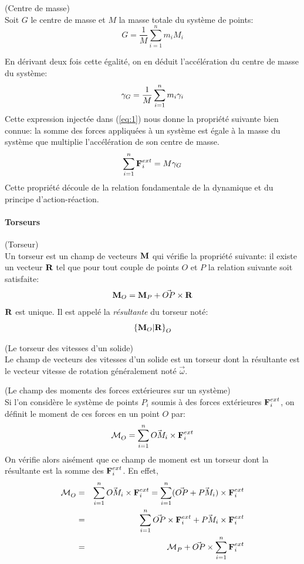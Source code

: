 \begin{mydef}(Centre de masse)\\
  Soit $G$ le centre de masse et $M$ la
  masse totale du système de
  points:
  $$
  G = \frac{1}{M}\sum_{i=1}^{n} m_i M_i
  $$
\end{mydef}

En dérivant deux fois cette égalité, on en déduit l'accélération du
centre de masse du système:
$$
\gamma_{G} = \frac{1}{M}\sum_{i=1}^{n} m_i \gamma_{i}
$$
Cette expression injectée dans (\ref{eq:1}) nous donne la propriété
suivante bien connue: la somme des forces appliquées à un système est
égale à la masse du système que multiplie l'accélération de son centre
de masse.
$$
\sum_{i=1}^n \textbf{F}^{ext}_{i} = M \gamma_{G} \\
$$
Cette propriété découle de la relation fondamentale de la dynamique et
du principe d'action-réaction.


\paragraph{Torseurs}

\begin{mydef} (Torseur)\\
  Un torseur est un champ de vecteurs $\textbf{M}$ qui vérifie la propriété
  suivante: il existe un vecteur $\textbf{R}$ tel que pour tout couple de
  points $O$ et $P$ la relation suivante soit satisfaite:
  $$
  \textbf{M}_O = \textbf{M}_P + \vec{OP} \times \textbf{R}
  $$
  $\textbf{R}$ est unique. Il est appelé la {\em résultante} du torseur
  noté:
  $$
  \left\{\textbf{M}_O|\textbf{R}\right\}_{O}
  $$
\end{mydef}

\begin{myexample} (Le torseur des vitesses d'un solide)\\
  Le champ de vecteurs des vitesses d'un solide est un torseur dont la
  résultante est le vecteur vitesse de rotation généralement noté
  $\vec{\omega}$.
\end{myexample}

\begin{myexample} (Le champ des moments des forces extérieures sur un système)\\
  Si l'on considère le système de points $P_i$ soumis à des forces
  extérieures $\textbf{F}_i^{ext}$, on définit le moment de ces forces en
  un point $O$ par:
  $$
  {\cal M}_{O}^{} = \sum_{i=1}^{n} \vec{OM_i}\times \textbf{F}_i^{ext}
  $$
  On vérifie alors aisément que ce champ de moment est un torseur dont
  la résultante est la somme des $\textbf{F}_i^{ext}$. En
  effet,
  \begin{eqnarray*}
    {\cal M}_{O}^{} &=& \sum_{i=1}^{n} \vec{OM_i}\times \textbf{F}_i^{ext}
    =\sum_{i=1}^{n} (\vec{OP}+\vec{PM_i})\times \textbf{F}_i^{ext} \\
    &=& \sum_{i=1}^{n} \vec{OP}\times \textbf{F}_i^{ext} +
    \vec{PM_i}\times \textbf{F}_i^{ext} \\
    &=& {\cal M}_{P}^{} + \vec{OP} \times \sum_{i=1}^{n} \textbf{F}_i^{ext}
  \end{eqnarray*}
\end{myexample}


